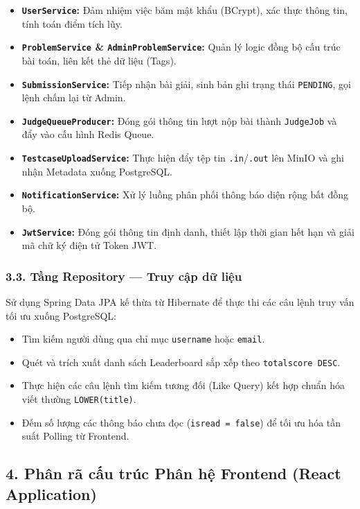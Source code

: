 \documentclass[12pt,a4paper]{article}
\renewcommand{\_}{\BreakableUnderscore}
\providecommand{\tightlist}{%
  \setlength{\itemsep}{0pt}\setlength{\parskip}{0pt}}
\begin{document}
\begin{itemize}
\tightlist
\item
  \textbf{\texttt{UserService}:} Đảm nhiệm việc băm mật khẩu (BCrypt), xác thực thông tin, tính toán điểm tích lũy.
\item
  \textbf{\texttt{ProblemService} \& \texttt{AdminProblemService}:} Quản lý logic đồng bộ cấu trúc bài toán, liên kết thẻ dữ liệu (Tags).
\item
  \textbf{\texttt{SubmissionService}:} Tiếp nhận bài giải, sinh bản ghi trạng thái \texttt{PENDING}, gọi lệnh chấm lại từ Admin.
\item
  \textbf{\texttt{JudgeQueueProducer}:} Đóng gói thông tin lượt nộp bài thành \texttt{JudgeJob} và đẩy vào cấu hình Redis Queue.
\item
  \textbf{\texttt{TestcaseUploadService}:} Thực hiện đẩy tệp tin \texttt{.in}/\texttt{.out} lên MinIO và ghi nhận Metadata xuống PostgreSQL.
\item
  \textbf{\texttt{NotificationService}:} Xử lý luồng phân phối thông báo diện rộng bất đồng bộ.
\item
  \textbf{\texttt{JwtService}:} Đóng gói thông tin định danh, thiết lập thời gian hết hạn và giải mã chữ ký điện tử Token JWT.
\end{itemize}

\subsubsection{3.3. Tầng Repository --- Truy cập dữ liệu}

Sử dụng Spring Data JPA kế thừa từ Hibernate để thực thi các câu lệnh truy vấn tối ưu xuống PostgreSQL:

\begin{itemize}
\tightlist
\item
  Tìm kiếm người dùng qua chỉ mục \texttt{username} hoặc \texttt{email}.
\item
  Quét và trích xuất danh sách Leaderboard sắp xếp theo \texttt{total\_score\ DESC}.
\item
  Thực hiện các câu lệnh tìm kiếm tương đối (Like Query) kết hợp chuẩn hóa viết thường \texttt{LOWER(title)}.
\item
  Đếm số lượng các thông báo chưa đọc (\texttt{is\_read\ =\ false}) để tối ưu hóa tần suất Polling từ Frontend.
\end{itemize}

\subsection{4. Phân rã cấu trúc Phân hệ Frontend (React Application)}
\end{document}
